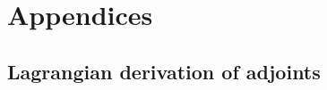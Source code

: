 \documentclass[12pt]{article}
\begin{document}


% 

\newpage
\appendix
\section*{Appendices}
\renewcommand{\thesubsection}{\Alph{subsection}}

\subsection{Lagrangian derivation of adjoints}



\newpage
\printbibliography[heading=bibintoc, title={References}]
\end{document}
